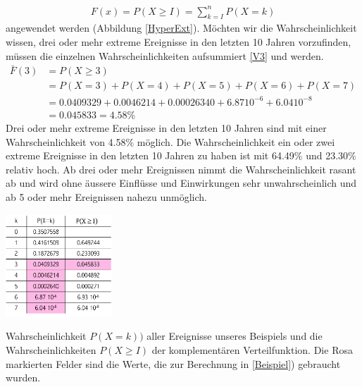 \begin{refsection}
\begin{align*}
F(x) = P(X \ge I ) = \sum \limits_{k=I}^n P(X = k)
\end{align*}
%
angewendet werden (Abbildung \ref{HyperExt}). 
Möchten wir die Wahrscheinlichkeit wissen, drei oder mehr extreme Ereignisse in den letzten 10 Jahren vorzufinden, müssen die einzelnen Wahrscheinlichkeiten aufsummiert \eqref{V3} und werden.
%
\begin{equation}
\begin{aligned}
\bar{F}(3) &=  P(X \ge 3) \\
&= P(X = 3) + P(X = 4) + P(X = 5) + P(X = 6) + P(X = 7) \\
&= 0.0409329 + 0.0046214 + 0.00026340 + 6.87 10^{ -6 } + 6.04 10^{ -8 } \\
&= 0.045833 = 4.58\%
\label{V3}
\end{aligned}
\end{equation}
%
Drei oder mehr extreme Ereignisse in den letzten 10 Jahren sind mit einer Wahrscheinlichkeit von 4.58\% möglich. 
Die Wahrscheinlichkeit ein oder zwei extreme Ereignisse in den letzten 10 Jahren zu haben ist mit 64.49\% und 23.30\% relativ hoch. Ab drei oder mehr Ereignissen nimmt die Wahrscheinlichkeit rasant ab und wird ohne äussere Einflüsse und Einwirkungen sehr unwahrscheinlich und ab 5 oder mehr Ereignissen nahezu unmöglich.
%
\begin{table}
\centering
\includegraphics[width=0.3\textwidth]{extrem/TabExt.pdf}
\caption{Wahrscheinlichkeit $P(X = k))$ aller Ereignisse unseres Beispiels und die Wahrscheinlichkeiten $P(X \ge I)$ der komplementären Verteilfunktion. Die Rosa markierten Felder sind die Werte, die zur Berechnung in \ref{Beispiel}) gebraucht wurden. }
\label{TabExt}
\end{table}


\end{refsection}
